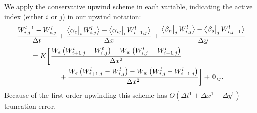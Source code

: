 \documentclass[12pt,final]{amsart}%
\newcommand{\Wlij}{W^l_{i,j}}
\newcommand{\upp}[3]{\big<#1\big|_{#3}\,#2\big>}
\begin{document}
We apply the conservative upwind scheme in each variable, indicating the active index (either $i$ or $j$) in our upwind notation:
\begin{align}
 &\frac{W_{i,j}^{l+1} - \Wlij}{\Delta t} + \frac{\upp{\alpha_e}{\Wlij}{i} - \upp{\alpha_w}{W_{i-1,j}^l}{i}}{\Delta x} + \frac{\upp{\beta_n}{\Wlij}{j} - \upp{\beta_s}{W_{i,j-1}^l}{j}}{\Delta y}  \label{eq:Wfd} \\
      &\qquad = K \bigg[\frac{W_e \left(W_{i+1,j}^l - \Wlij\right) - W_w \left(\Wlij - W_{i-1,j}^l\right)}{\Delta x^2}  \notag \\
      &\qquad\qquad\qquad + \frac{W_e \left(W_{i+1,j}^l - \Wlij\right) - W_w \left(\Wlij - W_{i-1,j}^l\right)}{\Delta x^2}\bigg] + \Phi_{ij}. \notag
\end{align}
Because of the first-order upwinding this scheme has $O(\Delta t^1 + \Delta x^1 + \Delta y^1)$ truncation error.




\small

\end{document}
